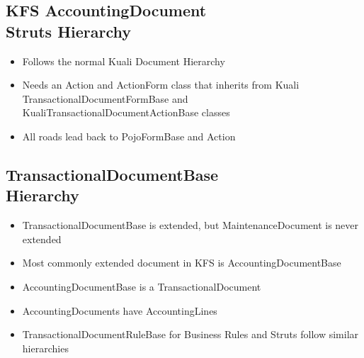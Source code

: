 \begin{ifhtml}
    \begin{s5slide}
      \section{KFS AccountingDocument\\
        Struts Hierarchy}
      \begin{itemize}
        \item Follows the normal Kuali Document Hierarchy
        \item Needs an Action and ActionForm class that inherits from
          Kuali TransactionalDocumentFormBase and KualiTransactionalDocumentActionBase classes
        \item All roads lead back to PojoFormBase and Action
        \end{itemize}
      \begin{slideshow}
      \item {}
      \item {}
      \item {}
      \end{slideshow}
      \begin{itemize}
      \end{itemize}
    \end{s5slide}

    \begin{s5slide}
      \section{TransactionalDocumentBase\\
        Hierarchy}
      \begin{itemize}
        \item TransactionalDocumentBase is extended, but MaintenanceDocument is never extended
        \item Most commonly extended document in KFS is AccountingDocumentBase
        \item AccountingDocumentBase is a TransactionalDocument
        \item AccountingDocuments have AccountingLines
        \item TransactionalDocumentRuleBase for Business Rules and Struts follow similar hierarchies
      \end{itemize}
      
      \begin{slideshow}
      \item {}
      \item {}
      \end{slideshow}
    \end{s5slide}

\end{ifhtml}